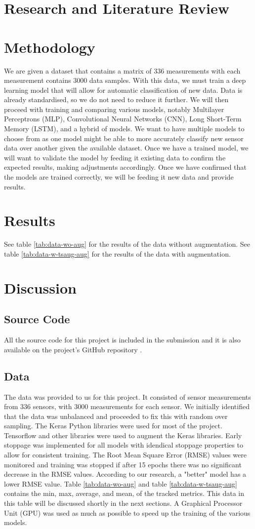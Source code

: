 \documentclass[conference]{IEEEtran}
\begin{document}
\section{Research and Literature Review}
\section{Methodology}
We are given a dataset that contains a matrix of 336 measurements with each measurement contains 3000 data samples. With this data, we must train a deep learning model that will allow for automatic classification of new data. Data is already standardised, so we do not need to reduce it further. We will then proceed with training and comparing various models, notably Multilayer Perceptrons (MLP), Convolutional Neural Networks (CNN), Long Short-Term Memory (LSTM), and a hybrid of models. We want to have multiple models to choose from as one model might be able to more accurately classify new sensor data over another given the available dataset. Once we have a trained model, we will want to validate the model by feeding it existing data to confirm the expected results, making adjustments accordingly. Once we have confirmed that the models are trained correctly, we will be feeding it new data and provide results.
\section{Results}
See table \ref{tab:data-wo-aug} for the results of the data without augmentation. See table \ref{tab:data-w-tsaug-aug} for the results of the data with augmentation.
\section{Discussion}
\subsection{Source Code}
All the source code for this project is included in the submission and it is also available on the project's GitHub repository \cite{github}.
\subsection{Data}
The data was provided to us for this project. It consisted of sensor measurements from 336 sensors, with 3000 measurements for each sensor. We initially identified that the data was unbalanced and proceeded to fix this with random over sampling. The Keras Python libraries \cite{keras} were used for most of the project. Tensorflow and other libraries were used to augment the Keras libraries. Early stoppage was implemented for all models with idendical stoppage properties to allow for consistent training. The Root Mean Square Error (RMSE) values were monitored and training was stopped if after 15 epochs there was no significant decrease in the RMSE values. According to our research, a "better" model has a lower RMSE value. Table \ref{tab:data-wo-aug} and table \ref{tab:data-w-tsaug-aug} contains the min, max, average, and mean, of the tracked metrics. This data in this table will be discussed shortly in the next sections. A Graphical Processor Unit (GPU) was used as much as possible to speed up the training of the various models.
\end{document}
